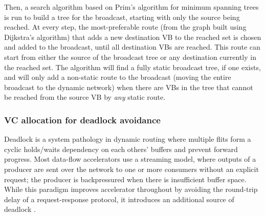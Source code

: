 Then, a search algorithm based on Prim's algorithm for minimum spanning trees \cite{prim1957shortest} is run to build a tree for the broadcast, starting with only the source being reached.
At every step, the most-preferable route (from the graph built using Dijkstra's algorithm) that adds a new destination VB to the reached set is chosen and added to the broadcast, until all destination VBs are reached. 
This route can start from either the source of the broadcast tree or any destination currently in the reached set.
The algorithm will find a fully static broadcast tree, if one exists, and will only add a non-static route to the broadcast (moving the entire broadcast to the dynamic network) when there are VBs in the tree that cannot be reached from the source VB by \emph{any} static route.

\subsubsection{VC allocation for deadlock avoidance} \label{sec:vc_alloc}
Deadlock is a system pathology in dynamic routing where multiple flits form a cyclic holds/waits dependency on each others' buffers and prevent forward progress.
Most data-flow accelerators use a streaming model, where outputs of a producer are sent over the network to one or more consumers
without an explicit request; the producer is backpressured when there is insufficient buffer space. 
While this paradigm improves accelerator throughout by avoiding the round-trip delay of a request-response protocol, it introduces an additional source of deadlock \cite{hansson2007avoiding}. 

